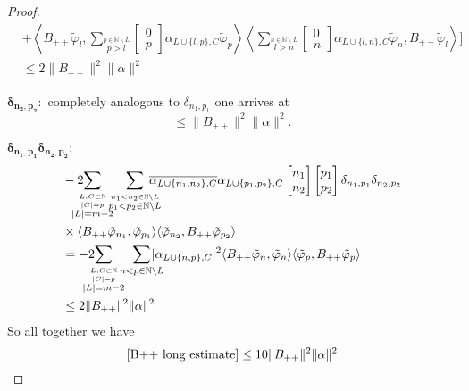 \documentclass[b5paper,draft,openbib,12pt]{memoir}
\begin{document}
\begin{proof}
\begin{align}
&+\left\langle\!\!\! B_{++} \tilde{\varphi}_{l}, \!\!\!\!\sum_{\overset{p\in\mathbb{N}\backslash L}{p>l}}\!\!\left[\begin{matrix}0\\p\end{matrix}\right] \!\alpha_{L\cup\{l,p\},C}\tilde{\varphi}_p \!\!\!\right\rangle \left\langle \sum_{\overset{n\in\mathbb{N}\backslash L}{l>n}} \!\!\left[\begin{matrix}0\\n\end{matrix}\right]\!\!\alpha_{L\cup \{l,n\},C} \tilde{\varphi}_n,  B_{++} \tilde{\varphi}_l \!\!\!\right\rangle\Bigg]\\
&\le 2\|B_{++}\|^2 \|\alpha\|^2
\end{align}

\(\boldsymbol{\delta_{n_2,p_2}:}\) completely analogous to \(\delta_{n_1,p_1}\) one arrives at 
\begin{equation}
  \le \|B_{++}\|^2\|\alpha\|^2.
\end{equation}

\(\boldsymbol{\delta_{n_1,p_1}\delta_{n_2,p_2}:}\)
\begin{align}
&-2\hspace{-0.4cm}\sum_{\overset{L,C\subset \mathbb{N}}{\overset{|C|=p}{|L|=m-2}}}\hspace{-0.2cm}\sum_{\overset{n_1<n_2\in\mathbb{N}\backslash L }{p_1<p_2\in\mathbb{N}\backslash L }}
\hspace{-0.4cm}\overline{\alpha_{L\cup\{n_1,n_2\},C}}\alpha_{L\cup\{p_1,p_2\},C}
\left[\begin{matrix}n_1\\n_2\end{matrix}\right]\left[\begin{matrix}p_1\\p_2\end{matrix}\right]\delta_{n_1,p_1}\delta_{n_2,p_2}\\
&\times
\langle B_{++}\tilde{\varphi}_{n_1},\tilde{\varphi}_{p_1} \rangle \langle  \tilde{\varphi}_{n_2}, B_{++}\tilde{\varphi}_{p_2}\rangle\\
&=-2\hspace{-0.4cm}\sum_{\overset{L,C\subset \mathbb{N}}{\overset{|C|=p}{|L|=m-2}}}\hspace{-0.2cm}\sum_{n< p\in\mathbb{N}\backslash L }
\hspace{-0.4cm}|\alpha_{L\cup\{n,p\},C}|^2
\langle B_{++}\tilde{\varphi}_{n},\tilde{\varphi}_{n} \rangle \langle  \tilde{\varphi}_{p}, B_{++}\tilde{\varphi}_{p}\rangle\\
&\le 2 \|B_{++}\|^2 \|\alpha\|^2
\end{align}
So all together we have 
\begin{equation}\label{B++ long estimate final}
  \eqref{B++ long estimate}\le 10 \|B_{++}\|^2 \|\alpha\|^2
\end{equation}


\end{proof}
\end{document}

